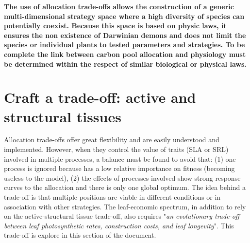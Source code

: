 \textbf{The use of allocation trade-offs allows the construction of a generic multi-dimensional strategy space where a high diversity of species can potentially coexist. Because this space is based on physic laws, it ensures the non existence of Darwinian demons and does not limit the species or individual plants to tested parameters and strategies. To be complete the link between carbon pool allocation and physiology must be determined within the respect of similar biological or physical laws.}

\section{Craft a trade-off: active and structural tissues}

Allocation trade-offs offer great flexibility and are easily understood and implemented. However, when they control the value of traits (SLA or SRL) involved in multiple processes, a balance must be found to avoid that: (1) one process is ignored because has a low relative importance on fitness (becoming useless to the model), (2) the effects of processes involved show strong response curves to the allocation and there is only one global optimum. The idea behind a trade-off is that multiple positions are viable in different conditions or in association with other strategies. The leaf-economic spectrum, in addition to rely on the active-structural tissue trade-off, also requires "\textit{an evolutionary trade-off
between leaf photosynthetic rates, construction costs, and leaf longevity}". This trade-off is explore in this section of the document.\\

